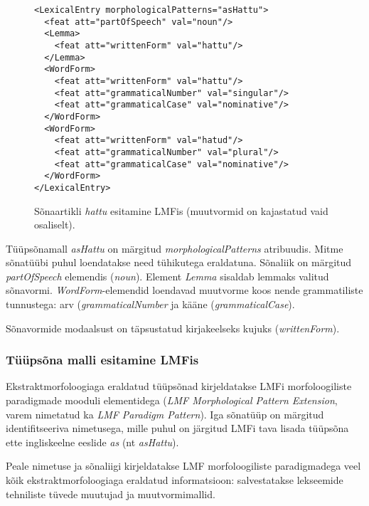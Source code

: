 \documentclass[12pt,a4paper]{article}
\begin{document}
\begin{figure}[h]
  \center
\begin{verbatim}
<LexicalEntry morphologicalPatterns="asHattu">
  <feat att="partOfSpeech" val="noun"/>
  <Lemma>
    <feat att="writtenForm" val="hattu"/>
  </Lemma>
  <WordForm>
    <feat att="writtenForm" val="hattu"/>
    <feat att="grammaticalNumber" val="singular"/>
    <feat att="grammaticalCase" val="nominative"/>
  </WordForm>
  <WordForm>
    <feat att="writtenForm" val="hatud"/>
    <feat att="grammaticalNumber" val="plural"/>
    <feat att="grammaticalCase" val="nominative"/>
  </WordForm>
</LexicalEntry>
\end{verbatim}
\caption{Sõnaartikli \textit{hattu} esitamine LMFis (muutvormid on kajastatud vaid osaliselt).
  \label{code:lmf-lexicalentry}}
\end{figure}

Tüüpsõnamall \textit{asHattu} on märgitud \textit{morphological\-Patterns} atribuudis. Mitme sõnatüübi puhul loendatakse need tühikutega eraldatuna. Sõnaliik on märgitud \textit{part\-Of\-Speech} elemendis (\textit{noun}). Element \textit{Lemma} sisaldab lemmaks valitud sõnavormi. \textit{Word\-Form}-elemendid loendavad muutvorme koos nende grammatiliste tunnustega: arv (\textit{grammatical\-Number} ja kääne (\textit{grammatical\-Case}).

Sõnavormide modaalsust on täpsustatud kirjakeelseks kujuks (\textit{writtenForm}).




\subsubsection{Tüüpsõna malli esitamine LMFis}

Ekstraktmorfoloogiaga eraldatud tüüpsõnad kirjeldatakse LMFi morfoloogiliste paradigmade mooduli elementidega (\textit{LMF Morphological Pattern Extension}, varem nimetatud ka \textit{LMF Paradigm Pattern}). Iga sõnatüüp on märgitud identifitseeriva nimetusega, mille puhul on järgitud LMFi tava lisada tüüpsõna ette ingliskeelne eeslide \textit{as} (nt \textit{asHattu}).

Peale nimetuse ja sõnaliigi kirjeldatakse LMF morfoloogiliste paradigmadega veel kõik ekstraktmorfoloogiaga eraldatud informatsioon: salvestatakse lekseemide tehniliste tüvede muutujad ja muutvormimallid.
\end{document}
